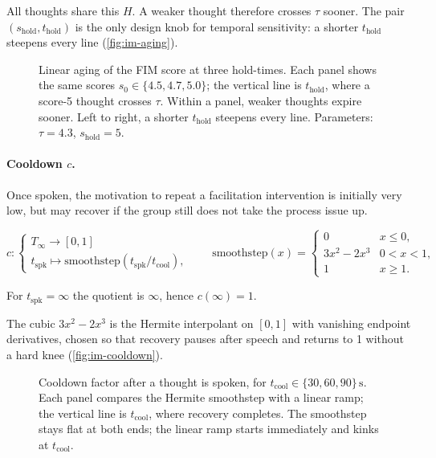 All thoughts share this \(H\). A weaker thought therefore crosses \(\tau\) sooner. The pair
\((s_{\mathrm{hold}}, t_{\mathrm{hold}})\) is the only design knob for temporal sensitivity: a
shorter \(t_{\mathrm{hold}}\) steepens every line (\autoref{fig:im-aging}).

\begin{figure}[H]
  \centering
  
  \caption{Linear aging of the FIM score at three hold-times. Each panel shows the same
    scores \(s_0\in\{4.5,4.7,5.0\}\); the vertical line is \(t_{\mathrm{hold}}\), where a
    score-5 thought crosses \(\tau\). Within a panel, weaker thoughts expire sooner. Left to
    right, a shorter \(t_{\mathrm{hold}}\) steepens every line.
    Parameters: \(\tau=4.3\), \(s_{\mathrm{hold}}=5\).
  }
  \label{fig:im-aging}
\end{figure}

\paragraph{Cooldown \(c\).}
Once spoken, the motivation to repeat a facilitation intervention is initially very low, but may
recover if the group still does not take the process issue up.

\begin{equation}
  c :
  \begin{cases}
    T_{\infty} \to [0,1] \\
    t_{\mathrm{spk}} \mapsto \mathrm{smoothstep}(t_{\mathrm{spk}}/t_{\mathrm{cool}}),
  \end{cases}
  \qquad
  \mathrm{smoothstep}(x)=
  \begin{cases}
    0 & x\le 0,\\
    3x^{2}-2x^{3} & 0<x<1,\\
    1 & x\ge 1.
  \end{cases}
  \label{eq:im-smoothstep}
\end{equation}

For \(t_{\mathrm{spk}}=\infty\) the quotient is \(\infty\), hence \(c(\infty)=1\).

The cubic \(3x^{2}-2x^{3}\) is the Hermite interpolant on \([0,1]\) with vanishing endpoint
derivatives, chosen so that recovery pauses after speech and returns to 1 without a hard knee
(\autoref{fig:im-cooldown}).

\begin{figure}[H]
  \centering
  
  \caption{Cooldown factor after a thought is spoken, for \(t_{\mathrm{cool}}\in\{30,60,90\}\,\mathrm{s}\).
    Each panel compares the Hermite smoothstep with a linear ramp; the vertical line is
    \(t_{\mathrm{cool}}\), where recovery completes. The smoothstep stays flat at both ends;
    the linear ramp starts immediately and kinks at \(t_{\mathrm{cool}}\).
  }
  \label{fig:im-cooldown}
\end{figure}

